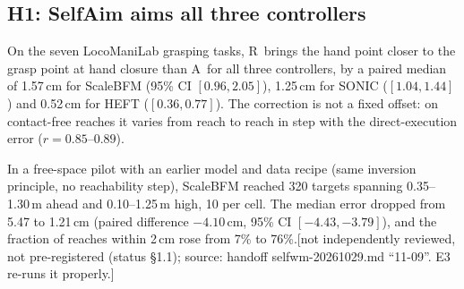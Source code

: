 \documentclass[conference]{IEEEtran}
\newif\ifdraft \drafttrue
\newcommand{\dnote}[1]{\ifdraft{\color{red}\footnotesize[#1]}\fi}
\newcommand{\Ad}{\textsc{A}}       %
\newcommand{\Rr}{\textsc{R}}       %
\begin{document}
\subsection{H1: SelfAim aims all three controllers}
On the seven LocoManiLab grasping tasks, \Rr\ brings the hand point closer to the grasp point at hand closure than \Ad\ for all three controllers, by a paired median of 1.57\,cm for ScaleBFM (95\% CI $[0.96,2.05]$), 1.25\,cm for SONIC ($[1.04,1.44]$) and 0.52\,cm for HEFT ($[0.36,0.77]$). The correction is not a fixed offset: on contact-free reaches it varies from reach to reach in step with the direct-execution error ($r=0.85$--$0.89$).

In a free-space pilot with an earlier model and data recipe (same inversion principle, no reachability step), ScaleBFM reached 320 targets spanning 0.35--1.30\,m ahead and 0.10--1.25\,m high, 10 per cell. The median error dropped from 5.47 to 1.21\,cm (paired difference $-4.10$\,cm, 95\% CI $[-4.43,-3.79]$), and the fraction of reaches within 2\,cm rose from 7\% to 76\%.\dnote{not independently reviewed, not pre-registered (status §1.1); source: handoff selfwm-20261029.md ``11-09''. E3 re-runs it properly.}
\end{document}
